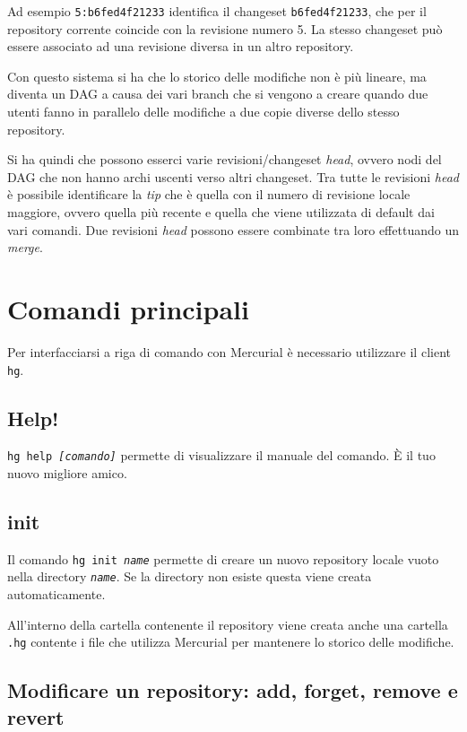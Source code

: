 Ad esempio \texttt{5:b6fed4f21233}  identifica il changeset \texttt{b6fed4f21233}, che per il repository corrente coincide con la revisione numero 5. La stesso changeset può essere associato ad una revisione diversa in un altro repository.

Con questo sistema si ha che lo storico delle modifiche non è più lineare, ma diventa un DAG a causa dei vari branch che si vengono a creare quando due utenti fanno in parallelo delle modifiche a due copie diverse dello stesso repository.

Si ha quindi che possono esserci varie revisioni/changeset \textit{head}, ovvero nodi del DAG che non hanno archi uscenti verso altri changeset.
Tra tutte le revisioni \textit{head} è possibile identificare la \textit{tip} che è quella con il numero di revisione locale maggiore, ovvero quella più recente e quella che viene utilizzata di default dai vari comandi.
Due revisioni \textit{head} possono essere combinate tra loro effettuando un \textit{merge}. 

\section{Comandi principali}

Per interfacciarsi a riga di comando con Mercurial è necessario utilizzare il client \texttt{hg}.

\subsection{Help!}

\texttt{hg help \textit{[comando]}} permette di visualizzare il manuale del comando. \`E il tuo nuovo migliore amico.

\subsection{init}

Il comando \texttt{hg init \textit{name}} permette di creare un nuovo repository locale vuoto nella directory \texttt{\textit{name}}. Se la directory non esiste questa viene creata automaticamente.

All'interno della cartella contenente il repository viene creata anche una cartella \texttt{.hg} contente i file che utilizza Mercurial per mantenere lo storico delle modifiche.

\subsection{Modificare un repository: add, forget, remove e revert}


